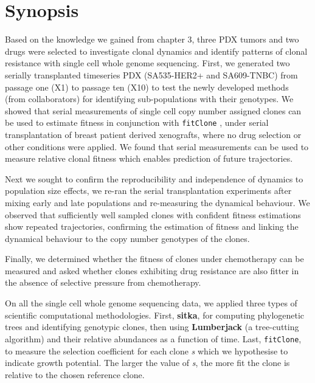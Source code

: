 \section{Synopsis}
Based on the knowledge we gained from chapter 3, three \ac{PDX} tumors and two drugs were selected to investigate clonal dynamics and identify patterns of clonal resistance with single cell whole genome sequencing. First, we generated two serially transplanted timeseries PDX (SA535-HER2+ and SA609-TNBC) from passage one (X1) to passage ten (X10) to test the newly developed methods (from collaborators) for identifying sub-populations with their genotypes.
We showed that serial measurements of single cell copy number assigned clones can be used to estimate fitness in conjunction with \texttt{fitClone} \cite{salehi2020single}, under serial transplantation of breast patient derived xenografts, where no drug selection or other conditions were applied. We found that serial measurements can be used to measure relative clonal fitness which enables prediction of future trajectories.

Next we sought to  confirm the reproducibility and independence of dynamics to population size effects, we re-ran the serial transplantation experiments after mixing early and late populations and re-measuring the dynamical behaviour. We observed that sufficiently well sampled clones with confident fitness estimations show repeated trajectories, confirming the estimation of fitness and linking the dynamical behaviour to the copy number genotypes of the clones.

Finally, we determined whether the fitness of clones under chemotherapy can be measured and asked whether clones exhibiting drug resistance are also fitter in the absence of selective pressure from chemotherapy. 

On all the single cell whole genome sequencing data, we applied three types of scientific computational methodologies. First, \textbf{sitka}, for computing phylogenetic trees and identifying genotypic clones, then using \textbf{Lumberjack} (a tree-cutting algorithm) and their relative abundances as a function of time. Last, \texttt{fitClone}, to measure the selection coefficient for each clone \textit{s} which we hypothesise to indicate growth potential. The larger the value of \textit{s}, the more fit the clone is relative to the chosen reference clone. 


